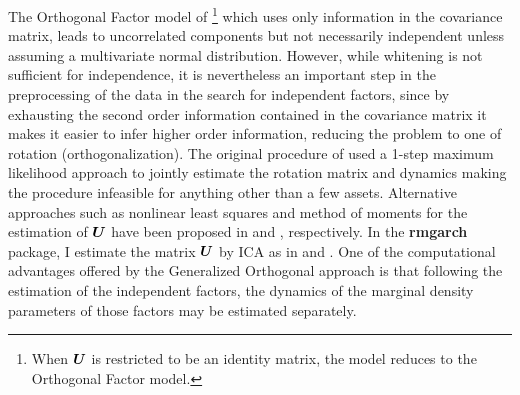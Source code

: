 The Orthogonal Factor model of \cite{Alexander2001}\footnote{When $\mbox{\boldmath$U$}$
is restricted to be an identity matrix, the model reduces to the Orthogonal
Factor model.} which uses only information in the covariance matrix, leads to
uncorrelated components but not necessarily independent unless assuming a
multivariate normal distribution. However, while whitening is not sufficient
for independence, it is nevertheless an important step in the preprocessing of
the data in the search for independent factors, since by exhausting the second
order information contained in the covariance matrix it makes it easier to infer
higher order information, reducing the problem to one of rotation (orthogonalization).
The original procedure of \cite{Weide2002} used a 1-step maximum likelihood
approach to jointly estimate the rotation matrix and dynamics making the procedure
infeasible for anything other than a few assets. Alternative approaches such as
nonlinear least squares and method of moments for the estimation of $\mbox{\boldmath$U$}$ have
been proposed in \cite{Weide2004} and \cite{Weide2008}, respectively.
In the {\bf rmgarch} package, I estimate the matrix \( \mbox{\boldmath$U$} \) by ICA as in
\cite{Broda2009} and \cite{Zhang2009}. One of the computational
advantages offered by the Generalized Orthogonal approach is that following the
estimation of the independent factors, the dynamics of the marginal density
parameters of those factors may be estimated separately.
